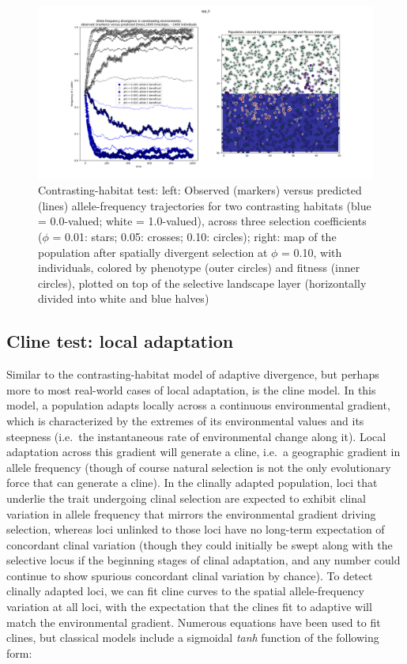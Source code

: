 ﻿\documentclass{article}
\begin{document}
\begin{figure}[h!]
\includegraphics[width=175mm]{./img/validation/divergence/divergence_test_ca1400_individuals_1000_timesteps.png}
        \caption{Contrasting-habitat test: left: Observed (markers) versus predicted (lines) allele-frequency trajectories for two contrasting habitats (blue = 0.0-valued; white = 1.0-valued), across three selection coefficients ($\phi$ = 0.01: stars; 0.05: crosses; 0.10: circles); right: map of the population after spatially divergent selection at $\phi$ = 0.10, with individuals, colored by phenotype (outer circles) and fitness (inner circles), plotted on top of the selective landscape layer (horizontally divided into white and blue halves)}
\end{figure}


\subsection{Cline test: local adaptation}
Similar to the contrasting-habitat model of adaptive divergence, but perhaps more
to most real-world cases of local adaptation, is the cline model. In this model,
a population adapts locally across a continuous environmental gradient,
which is characterized by the extremes of its environmental values and its steepness
(i.e.\ the instantaneous rate of environmental change along it). Local adaptation
across this gradient will generate a cline, i.e.\ a geographic gradient in allele frequency
(though of course natural selection is not the only evolutionary force that can
generate a cline). In the clinally adapted population, loci that underlie the trait
undergoing clinal selection are expected to exhibit clinal variation in allele frequency
that mirrors the environmental gradient driving selection, whereas loci unlinked to 
those loci have no long-term expectation of concordant clinal variation (though they could
initially be swept along with the selective locus if the beginning stages of clinal
adaptation, and any number could continue to show spurious concordant clinal variation
by chance). To detect clinally adapted loci, we can fit cline curves to the spatial
allele-frequency variation at all loci, with the expectation that the clines fit to
adaptive will match the environmental gradient. Numerous equations have been used
to fit clines, but classical models include a sigmoidal \emph{tanh} function
of the following form:
\end{document}
